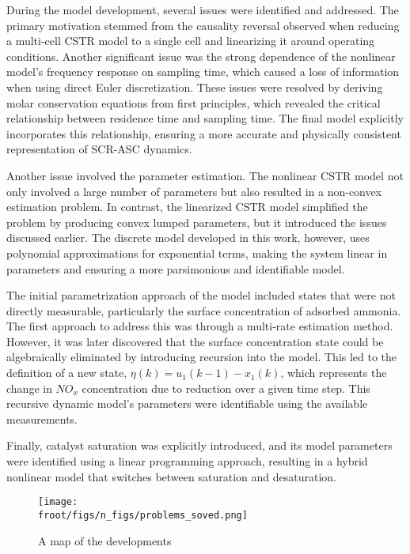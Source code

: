 During the model development, several issues were identified and addressed. The primary motivation stemmed from the
causality reversal observed when reducing a multi-cell CSTR model to a single cell and linearizing it around operating
conditions. Another significant issue was the strong dependence of the nonlinear model's frequency response on sampling
time, which caused a loss of information when using direct Euler discretization. These issues were resolved by deriving
molar conservation equations from first principles, which revealed the critical relationship between residence time and
sampling time. The final model explicitly incorporates this relationship, ensuring a more accurate and physically
consistent representation of SCR-ASC dynamics.

Another issue involved the parameter estimation. The nonlinear CSTR model not only involved a large number of parameters
but also resulted in a non-convex estimation problem. In contrast, the linearized CSTR model simplified the problem by
producing convex lumped parameters, but it introduced the issues discussed earlier. The discrete model developed in this
work, however, uses polynomial approximations for exponential terms, making the system linear in parameters and ensuring
a more parsimonious and identifiable model.

The initial parametrization approach of the model included states that were not directly measurable, particularly the
surface concentration of adsorbed ammonia. The first approach to address this was through a multi-rate estimation
method. However, it was later discovered that the surface concentration state could be algebraically eliminated by
introducing recursion into the model. This led to the definition of a new state, $\eta(k) = u_1(k-1) - x_1(k)$, which
represents the change in $NO_x$ concentration due to reduction over a given time step. This recursive dynamic model’s
parameters were identifiable using the available measurements.

Finally, catalyst saturation was explicitly introduced, and its model parameters were identified using a linear
programming approach, resulting in a hybrid nonlinear model that switches between saturation and desaturation.

\begin{figure}[H]
        \centering
        \texttt{[image: \\froot/figs/n\_figs/problems\_soved.png]}
        \caption{A map of the developments}
\end{figure}
